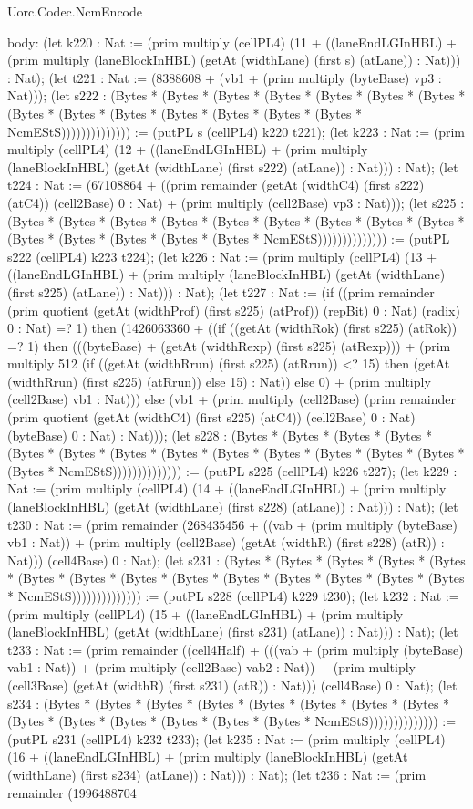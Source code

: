 \begin{lexlean}{Uorc.Codec.NcmEncode}
\begin{semanticmodule}
{  body: (let k220 : Nat := (prim multiply (cellPL4) (11 + ((laneEndLGInHBL) + (prim multiply (laneBlockInHBL) (getAt (widthLane) (first s) (atLane)) : Nat))) : Nat); (let t221 : Nat := (8388608 + (vb1 + (prim multiply (byteBase) vp3 : Nat))); (let s222 : (Bytes * (Bytes * (Bytes * (Bytes * (Bytes * (Bytes * (Bytes * (Bytes * (Bytes * (Bytes * (Bytes * (Bytes * (Bytes * (Bytes * NcmEStS)))))))))))))) := (putPL s (cellPL4) k220 t221); (let k223 : Nat := (prim multiply (cellPL4) (12 + ((laneEndLGInHBL) + (prim multiply (laneBlockInHBL) (getAt (widthLane) (first s222) (atLane)) : Nat))) : Nat); (let t224 : Nat := (67108864 + ((prim remainder (getAt (widthC4) (first s222) (atC4)) (cell2Base) 0 : Nat) + (prim multiply (cell2Base) vp3 : Nat))); (let s225 : (Bytes * (Bytes * (Bytes * (Bytes * (Bytes * (Bytes * (Bytes * (Bytes * (Bytes * (Bytes * (Bytes * (Bytes * (Bytes * (Bytes * NcmEStS)))))))))))))) := (putPL s222 (cellPL4) k223 t224); (let k226 : Nat := (prim multiply (cellPL4) (13 + ((laneEndLGInHBL) + (prim multiply (laneBlockInHBL) (getAt (widthLane) (first s225) (atLane)) : Nat))) : Nat); (let t227 : Nat := (if ((prim remainder (prim quotient (getAt (widthProf) (first s225) (atProf)) (repBit) 0 : Nat) (radix) 0 : Nat) =? 1) then (1426063360 + ((if ((getAt (widthRok) (first s225) (atRok)) =? 1) then (((byteBase) + (getAt (widthRexp) (first s225) (atRexp))) + (prim multiply 512 (if ((getAt (widthRrun) (first s225) (atRrun)) <? 15) then (getAt (widthRrun) (first s225) (atRrun)) else 15) : Nat)) else 0) + (prim multiply (cell2Base) vb1 : Nat))) else (vb1 + (prim multiply (cell2Base) (prim remainder (prim quotient (getAt (widthC4) (first s225) (atC4)) (cell2Base) 0 : Nat) (byteBase) 0 : Nat) : Nat))); (let s228 : (Bytes * (Bytes * (Bytes * (Bytes * (Bytes * (Bytes * (Bytes * (Bytes * (Bytes * (Bytes * (Bytes * (Bytes * (Bytes * (Bytes * NcmEStS)))))))))))))) := (putPL s225 (cellPL4) k226 t227); (let k229 : Nat := (prim multiply (cellPL4) (14 + ((laneEndLGInHBL) + (prim multiply (laneBlockInHBL) (getAt (widthLane) (first s228) (atLane)) : Nat))) : Nat); (let t230 : Nat := (prim remainder (268435456 + ((vab + (prim multiply (byteBase) vb1 : Nat)) + (prim multiply (cell2Base) (getAt (widthR) (first s228) (atR)) : Nat))) (cell4Base) 0 : Nat); (let s231 : (Bytes * (Bytes * (Bytes * (Bytes * (Bytes * (Bytes * (Bytes * (Bytes * (Bytes * (Bytes * (Bytes * (Bytes * (Bytes * (Bytes * NcmEStS)))))))))))))) := (putPL s228 (cellPL4) k229 t230); (let k232 : Nat := (prim multiply (cellPL4) (15 + ((laneEndLGInHBL) + (prim multiply (laneBlockInHBL) (getAt (widthLane) (first s231) (atLane)) : Nat))) : Nat); (let t233 : Nat := (prim remainder ((cell4Half) + (((vab + (prim multiply (byteBase) vab1 : Nat)) + (prim multiply (cell2Base) vab2 : Nat)) + (prim multiply (cell3Base) (getAt (widthR) (first s231) (atR)) : Nat))) (cell4Base) 0 : Nat); (let s234 : (Bytes * (Bytes * (Bytes * (Bytes * (Bytes * (Bytes * (Bytes * (Bytes * (Bytes * (Bytes * (Bytes * (Bytes * (Bytes * (Bytes * NcmEStS)))))))))))))) := (putPL s231 (cellPL4) k232 t233); (let k235 : Nat := (prim multiply (cellPL4) (16 + ((laneEndLGInHBL) + (prim multiply (laneBlockInHBL) (getAt (widthLane) (first s234) (atLane)) : Nat))) : Nat); (let t236 : Nat := (prim remainder (1996488704 }
\end{semanticmodule}
\end{lexlean}
